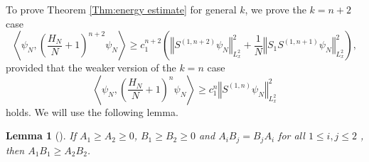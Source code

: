 \documentclass[12pt,letterpaper,leqno]{amsart}
\theoremstyle{plain}
\newtheorem{lemma}{Lemma}
\numberwithin{equation}{section}
\numberwithin{theorem}{section}
\numberwithin{proposition}{section}
\numberwithin{lemma}{section}
\numberwithin{corollary}{section}
\begin{document}
To prove Theorem \ref{Thm:energy estimate} for general $k$, we prove the $%
k=n+2$ case 
\begin{equation*}
\left\langle \psi _{N},\left( \frac{H_{N}}{N}+1\right) ^{n+2}\psi
_{N}\right\rangle \geqslant c_{1}^{n+2}\left( \left\Vert S^{(1,n+2)}\psi
_{N}\right\Vert _{L_{x}^{2}}^{2}+\frac{1}{N}\left\Vert S_{1}S^{(1,n+1)}\psi
_{N}\right\Vert _{L_{x}^{2}}^{2}\right) ,
\end{equation*}%
provided that the weaker$\ $version of the $k=n$ case%
\begin{equation}
\left\langle \psi _{N},\left( \frac{H_{N}}{N}+1\right) ^{n}\psi
_{N}\right\rangle \geqslant c_{1}^{n}\left\Vert S^{(1,n)}\psi
_{N}\right\Vert _{L_{x}^{2}}^{2}  \label{eqn:induction hypothesis in energy}
\end{equation}%
holds. We will use the following lemma.

\begin{lemma}[{\protect\cite[Lemma A.2]{C-HFocusing}}]
\quad \label{LemmaInEnergyEstimate:commuteop}If $A_{1}\geq A_{2}\geq 0$, $%
B_{1}\geq B_{2}\geq 0$ and $A_{i}B_{j}=B_{j}A_{i}$ for all $1\leq i,j\leq 2$%
, then $A_{1}B_{1}\geq A_{2}B_{2}$.
\end{lemma}
\end{document}
